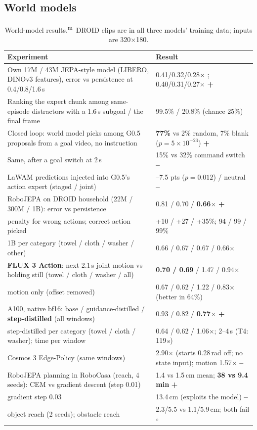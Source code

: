 \documentclass[10pt,a4paper]{article}
\DeclareRobustCommand{\meas}{\textsuperscript{\textcolor{green!50!black}{m}}}
\newcommand{\pos}{\textcolor{green!45!black}{\textbf{+}}}
\newcommand{\negr}{\textcolor{red!70!black}{\textbf{--}}}
\newcommand{\neu}{\textcolor{gray}{$\circ$}}
\begin{document}
\subsection{World models}
\label{sec:res-wm}
\begin{table}[H]\centering\small
\begin{tabularx}{\textwidth}{Yl}
\toprule
Experiment & Result \\
\midrule
Own 17M / 43M JEPA-style model (LIBERO, DINOv3 features), error vs persistence at 0.4/0.8/1.6\,s & 0.41/0.32/0.28$\times$ ; 0.40/0.31/0.27$\times$ \pos\\
Ranking the expert chunk among same-episode distractors with a 1.6\,s subgoal / the final frame & 99.5\% / 20.8\% (chance 25\%) \\
Closed loop: world model picks among G0.5 proposals from a goal video, no instruction & \textbf{77\%} vs 2\% random, 7\% blank ($p=5\times10^{-23}$) \pos\\
Same, after a goal switch at 2\,s & 15\% vs 32\% command switch \negr\\
LaWAM predictions injected into G0.5's action expert (staged / joint) & --7.5 pts ($p=0.012$) / neutral \negr\\
\midrule
RoboJEPA on DROID household (22M / 300M / 1B): error vs persistence & 0.81 / 0.70 / \textbf{0.66}$\times$ \pos\\
\quad penalty for wrong actions; correct action picked & +10 / +27 / +35\%; 94 / 99 / 99\% \\
\quad 1B per category (towel / cloth / washer / other) & 0.66 / 0.67 / 0.67 / 0.66$\times$ \\
\textbf{FLUX 3 Action}: next 2.1\,s joint motion vs holding still (towel / cloth / washer / all) & \textbf{0.70 / 0.69} / 1.47 / 0.94$\times$ \\
\quad motion only (offset removed) & 0.67 / 0.62 / 1.22 / 0.83$\times$ (better in 64\%) \\
\quad A100, native bf16: base / guidance-distilled / \textbf{step-distilled} (all windows) & 0.93 / 0.82 / \textbf{0.77}$\times$ \pos\\
\quad step-distilled per category (towel / cloth / washer); time per window & 0.64 / 0.62 / 1.06$\times$; 2--4\,s (T4: 119\,s) \\
Cosmos 3 Edge-Policy (same windows) & 2.90$\times$ (starts 0.28\,rad off; no state input); motion 1.57$\times$ \negr\\
\midrule
RoboJEPA planning in RoboCasa (reach, 4 seeds): CEM vs gradient descent (step 0.01) & 1.4 vs 1.5\,cm mean; \textbf{38 vs 9.4\,min} \pos\\
\quad gradient step 0.03 & 13.4\,cm (exploits the model) \negr\\
\quad object reach (2 seeds); obstacle reach & 2.3/5.5 vs 1.1/5.9\,cm; both fail \neu\\
\bottomrule
\end{tabularx}
\caption{World-model results.\meas\ DROID clips are in all three models' training data; inputs are 320$\times$180.}
\end{table}
\end{document}
